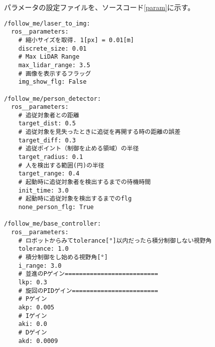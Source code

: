 パラメータの設定ファイルを、ソースコード\ref{param}に示す。
\begin{lstlisting}[caption=follow\_me\_params.yaml, label=param]
/follow_me/laser_to_img:
  ros__parameters:
    # 縮小サイズを取得. 1[px] = 0.01[m]
    discrete_size: 0.01
    # Max LiDAR Range
    max_lidar_range: 3.5
    # 画像を表示するフラッグ
    img_show_flg: False

/follow_me/person_detector:
  ros__parameters:
    # 追従対象者との距離
    target_dist: 0.5
    # 追従対象を見失ったときに追従を再開する時の距離の誤差
    target_diff: 0.3
    # 追従ポイント（制御を止める領域）の半径
    target_radius: 0.1
    # 人を検出する範囲(円)の半径
    target_range: 0.4
    # 起動時に追従対象者を検出するまでの待機時間
    init_time: 3.0
    # 起動時に追従対象を検出するまでのflg
    none_person_flg: True
  
/follow_me/base_controller:
  ros__parameters:
    # ロボットからみてtolerance[°]以内だったら積分制御しない視野角
    tolerance: 1.0
    # 積分制御をし始める視野角[°]
    i_range: 3.0
    # 並進のPゲイン==========================
    lkp: 0.3
    # 旋回のPIDゲイン========================
    # Pゲイン
    akp: 0.005
    # Iゲイン
    aki: 0.0
    # Dゲイン
    akd: 0.0009
\end{lstlisting}

